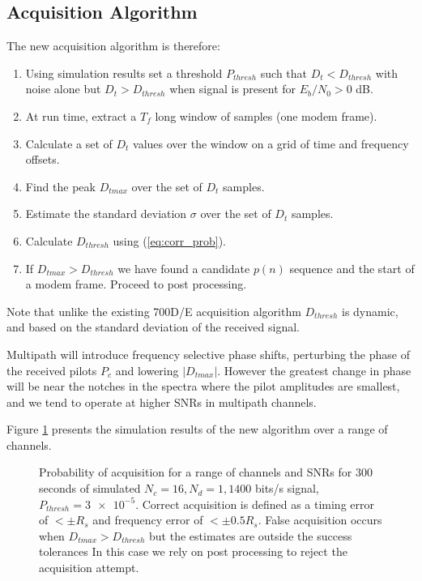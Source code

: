 \documentclass{article}
\begin{document}
\subsection{Acquisition Algorithm}

The new acquisition algorithm is therefore:
\begin{enumerate}
\item Using simulation results set a threshold $P_{thresh}$ such that $D_t < D_{thresh}$ with noise alone but $D_t > D_{thresh}$ when signal is present for $E_b/N_0 > 0$ dB.
\item At run time, extract a $T_f$ long window of samples (one modem frame).
\item Calculate a set of $D_t$ values over the window on a grid of time and frequency offsets.
\item Find the peak $D_{tmax}$ over the set of $D_t$ samples.
\item Estimate the standard deviation $\sigma$ over the set of $D_t$ samples.
\item Calculate $D_{thresh}$ using (\ref{eq:corr_prob}).
\item If $D_{tmax} > D_{thresh}$ we have found a candidate $p(n)$ sequence and the start of a modem frame. Proceed to post processing.
\end{enumerate}
Note that unlike the existing 700D/E acquisition algorithm $D_{thresh}$ is dynamic, and based on the standard deviation of the received signal.

Multipath will introduce frequency selective phase shifts, perturbing the phase of the received pilots $P_c$ and lowering $|D_{tmax}|$.  However the greatest change in phase will be near the notches in the spectra where the pilot amplitudes are smallest, and we tend to operate at higher SNRs in multipath channels.

Figure \ref{fig:acq_curves} presents the simulation results of the new algorithm over a range of channels.

\begin{figure}[H]
\caption{Probability of acquisition for a range of channels and SNRs for 300 seconds of simulated $N_c=16, N_d=1, 1400$ bits/s signal, $P_{thresh}=\num{3e-5}$. Correct acquisition is defined as a timing error of $< \pm R_s$ and frequency error of $< \pm 0.5R_s$.  False acquisition occurs when $D_{tmax} > D_{thresh}$ but the estimates are outside the success tolerances  In this case we rely on post processing to reject the acquisition attempt.}
\label{fig:acq_curves}
\begin{center}

\end{center}
\end{figure}
\end{document}
